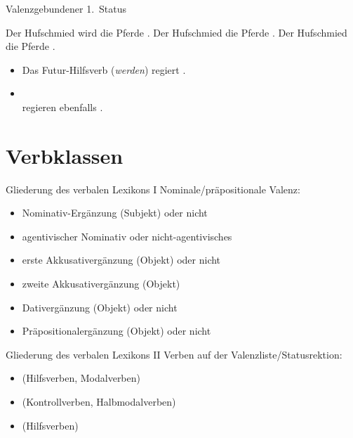 \begin{frame}
  {Valenzgebundener 1.~Status}
  \onslide<+->
  \onslide<+->
  \begin{exe}
    \ex Der Hufschmied \alert{wird} die Pferde .
    \Halbzeile
    \onslide<+->
    \ex Der Hufschmied  die Pferde .
    \ex Der Hufschmied  die Pferde .
  \end{exe}
  \Zeile
  \begin{itemize}[<+->]
    \item Das \alert{Futur-Hilfsverb (\textit{werden})} regiert .
    \item {}\\
      regieren ebenfalls .
  \end{itemize}
\end{frame}

\section{Verbklassen}

\begin{frame}
  {Gliederung des verbalen Lexikons I}
  \onslide<+->
  \onslide<+->
  Nominale\slash präpositionale Valenz:\\
  \begin{itemize}[<+->]
    \item \alert{Nominativ-Ergänzung} (Subjekt) oder nicht
    \item \alert{agentivischer Nominativ} oder nicht-agentivisches 
    \item erste \alert{Akkusativergänzung} (Objekt) oder nicht
    \item zweite Akkusativergänzung (Objekt)
    \item \alert{Dativergänzung} (Objekt) oder nicht
    \item \alert{Präpositionalergänzung} (Objekt) oder nicht
  \end{itemize}
\end{frame}

\begin{frame}
  {Gliederung des verbalen Lexikons II}
  \onslide<+->
  \onslide<+->
  Verben auf der Valenzliste\slash Statusrektion:\\
  \begin{itemize}[<+->]
    \item {} (Hilfsverben, Modalverben)
    \item {} (Kontrollverben, Halbmodalverben)
    \item {} (Hilfsverben)
  \end{itemize}
\end{frame}

